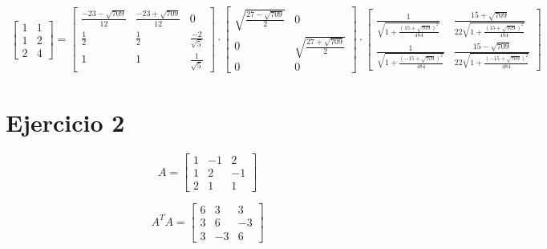 \documentclass[a4paper, spanish]{article}
\begin{document}
    \begin{align}
      \begin{bmatrix}
        1 & 1\\
        1 & 2\\
        2 & 4
      \end{bmatrix}
      =
      \begin{bmatrix}
        \frac{-23-\sqrt{709}}{12} & \frac{-23+\sqrt{709}}{12} & 0 \\
        \frac{1}{2} & \frac{1}{2} & \frac{-2}{\sqrt{5}} \\
        1 & 1 & \frac{1}{\sqrt{5}}
      \end{bmatrix}
      \cdot
      \begin{bmatrix}
        \sqrt{\frac{27 - \sqrt{709}}{2}} & 0 \\
        0 & \sqrt{\frac{27 + \sqrt{709}}{2}} \\
        0 & 0
      \end{bmatrix}
      \cdot
      \begin{bmatrix}
        \frac{1}{\sqrt{1 + \frac{(15 + \sqrt{709})^2}{484}}} &  \frac{15 + \sqrt{709}}{22\sqrt{1 + \frac{(15 + \sqrt{709})^2}{484}}}  \\
        \frac{1}{\sqrt{1 + \frac{(- 15 + \sqrt{709})^2}{484}}} & \frac{15 - \sqrt{709}}{22\sqrt{1 + \frac{(- 15 + \sqrt{709})^2}{484}}}
      \end{bmatrix}
    \end{align}


  \section{Ejercicio 2}


  \begin{equation}
    A =
    \begin{bmatrix}
      1 & -1 & 2\\
      1 & 2 & -1\\
      2 & 1 & 1
    \end{bmatrix}
  \end{equation}


  \begin{equation}
    A^TA =
    \begin{bmatrix}
      6 & 3 & 3 \\
      3 & 6 & -3 \\
      3 & -3 & 6
    \end{bmatrix}
  \end{equation}
\end{document}
